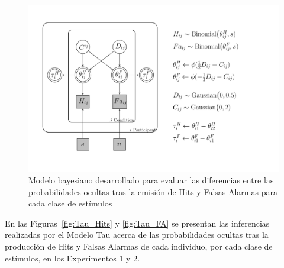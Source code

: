 \begin{figure}[th]
\centering
\includegraphics[width=1.1\textwidth]{Figures/Model_Tau_Diff_Tetas}
\caption[Modelo Tau: Modelo Bayesiano para evaluar las diferencias entre las tasas de Hits y Falsas Alarmas obtenidas por cada clase de estímulos]{Modelo bayesiano desarrollado para evaluar las diferencias entre las probabilidades ocultas tras la emisión de Hits y Falsas Alarmas para cada clase de estímulos}
\label{fig:Mod_Tau}
\end{figure}

En las Figuras~\ref{fig:Tau_Hits} y \ref{fig:Tau_FA} se presentan las inferencias realizadas por el Modelo Tau acerca de las probabilidades ocultas tras la producción de Hits y Falsas Alarmas de cada individuo, por cada clase de estímulos, en los Experimentos 1 y 2. \\

